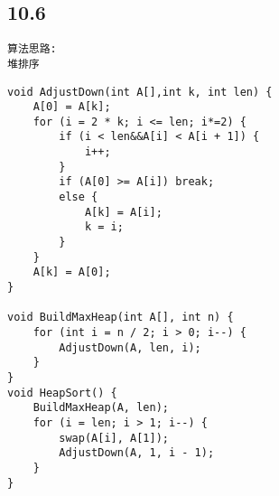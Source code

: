 \subsection{10.6}
\begin{lstlisting}[basicstyle=\small\ttfamily, caption={}, numbers=none]
算法思路:
堆排序
\end{lstlisting}
\begin{lstlisting}[basicstyle=\small\ttfamily, caption={}, numbers=none]
void AdjustDown(int A[],int k, int len) {
	A[0] = A[k];
	for (i = 2 * k; i <= len; i*=2) {
		if (i < len&&A[i] < A[i + 1]) {
			i++;
		}
		if (A[0] >= A[i]) break;
		else {
			A[k] = A[i];
			k = i;
		}
	}
	A[k] = A[0];
}

void BuildMaxHeap(int A[], int n) {
	for (int i = n / 2; i > 0; i--) {
		AdjustDown(A, len, i);
	}
}
void HeapSort() {
	BuildMaxHeap(A, len);
	for (i = len; i > 1; i--) {
		swap(A[i], A[1]);
		AdjustDown(A, 1, i - 1);
	}
}
\end{lstlisting}






